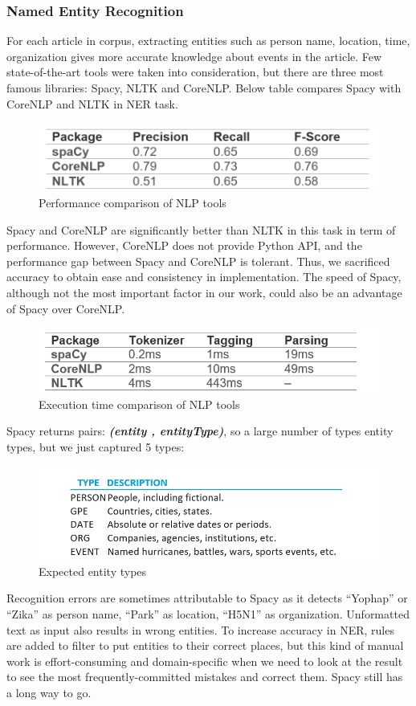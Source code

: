 \subsubsection{Named Entity Recognition}
For each article in corpus, extracting entities such as person name, location, time, organization gives more accurate knowledge about events in the article. Few state-of-the-art tools were taken into consideration, but there are three most famous libraries: Spacy, NLTK and CoreNLP. Below table compares Spacy with CoreNLP and NLTK in NER task.
\begin{figure}[h]
\centering
\includegraphics[scale= 0.35]{table_2.png}
\caption{Performance comparison of NLP tools \parencite{analytics_vidhya_misc}}
\end{figure}
Spacy and CoreNLP are significantly better than NLTK in this task in term of performance. However, CoreNLP does not provide Python API, and the performance gap between Spacy and CoreNLP is tolerant. Thus, we sacrificed accuracy to obtain ease and consistency in implementation. The speed of Spacy, although not the most important factor in our work, could also be an advantage of Spacy over CoreNLP.
\begin{figure}[h]
\centering
\includegraphics[scale= 0.5]{table_3.png}
\caption{Execution time comparison of NLP tools \parencite{analytics_vidhya_misc}}
\end{figure}
Spacy returns pairs:\textit{\textbf{ (entity , entityType)}}, so a large number of types entity types, but we just captured 5 types:
\begin{figure}[h]
\centering
\includegraphics[scale= 0.5]{table_4.png}
\caption{Expected entity types \parencite{spacy_ling_misc}}
\end{figure}
Recognition errors are sometimes attributable to Spacy as it detects “Yophap” or “Zika” as person name, “Park” as location, “H5N1” as organization. Unformatted text as input also results in wrong entities. To increase accuracy in NER, rules are added to filter to put entities to their correct places, but this kind of manual work is effort-consuming and domain-specific when we need to look at the result to see the most frequently-committed mistakes and correct them. Spacy still has a long way to go.
